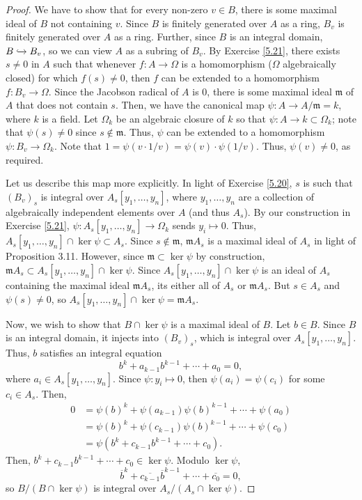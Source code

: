 \begin{proof}
We have to show that for every non-zero $v \in B$, there is some maximal ideal of $B$ not containing $v$. Since $B$ is finitely generated over
$A$ as a ring, $B_v$ is finitely generated over $A$ as a ring. Further, since $B$ is an integral domain, $B \xhookrightarrow{} B_v$, so we can
view $A$ as a subring of $B_v$. By Exercise \ref{5.21}, there exists $s \neq 0$ in $A$ such that whenever $f : A \to \Omega$ is a homomorphism
($\Omega$ algebraically closed) for which $f(s) \neq 0$, then $f$ can be extended to a homomorphism $f : B_v \to \Omega$. Since the Jacobson
radical of $A$ is $0$, there is some maximal ideal $\mathfrak{m}$ of $A$ that does not contain $s$. Then, we have the canonical map $\psi : A \to A/\mathfrak{m} = k$,
where $k$ is a field. Let $\Omega_k$ be an algebraic closure of $k$ so that $\psi : A \to k \subset \Omega_k$; note that $\psi(s) \neq 0$ since
$s \not\in \mathfrak{m}$. Thus, $\psi$ can be extended to a homomorphism $\psi : B_v \to \Omega_k$. Note that $1 = \psi(v \cdot 1/v) = \psi(v) \cdot \psi(1/v)$. 
Thus, $\psi(v) \neq 0$, as required.

Let us describe this map more explicitly. In light of Exercise \ref{5.20}, $s$ is such that $(B_v)_s$ is integral over $A_s[y_1,\ldots,y_n]$, where 
$y_1,\ldots,y_n$ are a collection of algebraically independent elements over $A$ (and thus $A_s$). By our construction in Exercise \ref{5.21}, 
$\psi : A_s[y_1,\ldots,y_n] \to \Omega_k$ sends $y_i \mapsto 0$. Thus, $A_s[y_1,\ldots,y_n] \cap \ker \psi \subset A_s$. Since $s \not\in \mathfrak{m}$,
$\mathfrak{m} A_s$ is a maximal ideal of $A_s$ in light of Proposition 3.11. However, since $\mathfrak{m} \subset \ker \psi$ by construction,
$\mathfrak{m} A_s \subset A_s[y_1,\ldots,y_n] \cap \ker \psi$. Since $A_s[y_1,\ldots,y_n] \cap \ker \psi$ is an ideal of $A_s$ containing the maximal 
ideal $\mathfrak{m} A_s$, its either all of $A_s$ or $\mathfrak{m} A_s$. But $s \in A_s$ and $\psi(s) \neq 0$, so $A_s[y_1,\ldots,y_n] \cap \ker \psi
= \mathfrak{m} A_s$.

Now, we wish to show that $B \cap \ker \psi$ is a maximal ideal of $B$. Let $b \in B$. Since $B$ is an integral domain, 
it injects into $(B_v)_s$, which is integral over $A_s[y_1,\ldots,y_n]$. Thus, $b$ satisfies an integral equation
$$b^k + a_{k-1}b^{k-1} + \cdots + a_0 = 0,$$
where $a_i \in A_s[y_1,\ldots,y_n]$. Since $\psi : y_i \mapsto 0$, then $\psi(a_i) = \psi(c_i)$ for some $c_i \in A_s$. Then,
\begin{align*}
0 &= \psi(b)^k + \psi(a_{k-1})\psi(b)^{k-1} + \cdots + \psi(a_0) \\
&= \psi(b)^k + \psi(c_{k-1})\psi(b)^{k-1} + \cdots + \psi(c_0) \\
&= \psi(b^k + c_{k-1}b^{k-1} + \cdots + c_0).
\end{align*}
Then, $b^k + c_{k-1}b^{k-1} + \cdots + c_0 \in \ker \psi$. Modulo $\ker \psi$,
$$\overline{b}^k + \overline{c_{k-1}}\overline{b}^{k-1} + \cdots + \overline{c_0} = 0,$$
so $B / (B \cap \ker \psi)$ is integral over $A_s / (A_s \cap \ker \psi)$.


\end{proof}
